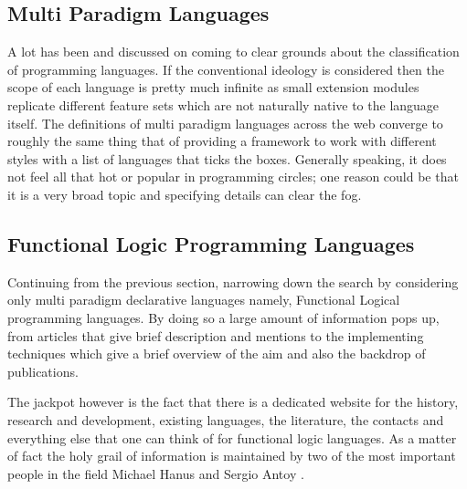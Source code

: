 \documentclass[thesis-solanki.tex]{subfiles}
\begin{document}
\subsection{Multi Paradigm Languages}

  A lot has been  and discussed on
  coming to clear grounds about the classification of programming languages.
  If the conventional ideology
  is considered then the scope of each language is pretty much infinite as small
  extension modules replicate different feature sets which are not naturally native to the language itself.
  The definitions of multi paradigm languages across the web
  \cite{website:wikimultiparadigm,website:mdn,website:blogc2} converge to roughly the same thing that of providing
  a framework to work with different styles with a list of languages \cite{website:wikimpllist,website:dmoz} that
  ticks the boxes.
  Generally speaking, it
  does not feel all that hot or popular in programming circles; one reason could be that it
  is a very broad topic and specifying details can clear the fog.

\subsection{Functional Logic Programming Languages}

  Continuing from the previous section, narrowing down the search by considering only multi paradigm declarative
  languages namely, Functional Logical programming languages.
  By doing so a large amount of information pops up, from articles that give brief description and mentions
  \cite{website:wikiflpl, website:wikiflpllist} to the implementing techniques \cite{website:imlpementingflpl}
  which give a brief overview of the aim and also the backdrop of publications.

  The jackpot however is the fact that there is a dedicated website \cite{website:funclogprog} for the history,
  research and development, existing languages, the literature, the contacts and everything else that one can think
  of for functional logic languages.
  As a matter of fact the holy grail of information is maintained by two of the most important people in the field
  Michael Hanus \cite{website:mhanus} and Sergio Antoy \cite{website:santoy}.
\end{document}
